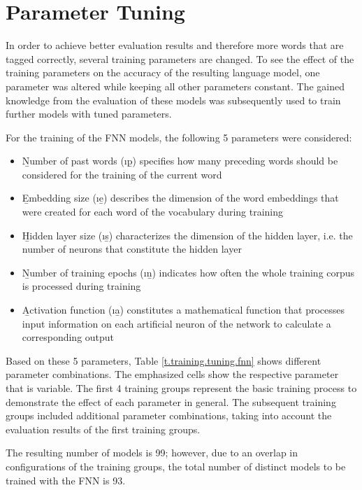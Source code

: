 \section{Parameter Tuning}\label{c.training.tuning}
In order to achieve better evaluation results and therefore more words that are tagged correctly, several training parameters are changed. To see the effect of the training parameters on the accuracy of the resulting language model, one parameter was altered while keeping all other parameters constant. The gained knowledge from the evaluation of these models was subsequently used to train further models with tuned parameters.

For the training of the FNN models, the following 5 parameters were considered:

\begin{itemize}
	\item \b{Number of past words} (\i{\b{p}}) specifies how many preceding words should be considered for the training of the current word
	\item \b{Embedding size} (\i{\b{e}}) describes the dimension of the word embeddings that were created for each word of the vocabulary during training
	\item \b{Hidden layer size} (\i{\b{s}}) characterizes the dimension of the hidden layer, i.e. the number of neurons that constitute the hidden layer
	\item \b{Number of training epochs} (\i{\b{n}}) indicates how often the whole training corpus is processed during training
	\item \b{Activation function} (\i{\b{a}}) constitutes a mathematical function that processes input information on each artificial neuron of the network to calculate a corresponding output
\end{itemize}

Based on these 5 parameters, Table \ref{t.training.tuning.fnn} shows different parameter combinations. The emphasized cells show the respective parameter that is variable. The first 4 training groups represent the basic training process to demonstrate the effect of each parameter in general. The subsequent training groups included additional parameter combinations, taking into account the evaluation results of the first training groups.

The resulting number of models is 99; however, due to an overlap in configurations of the training groups, the total number of distinct models to be trained with the FNN is 93.

